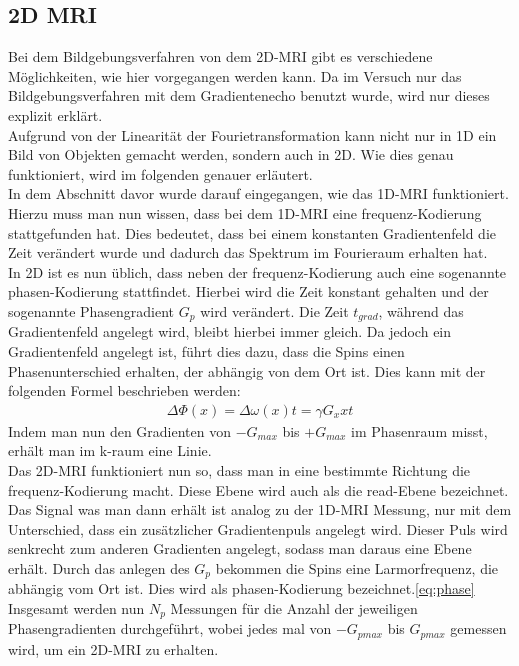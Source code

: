 \subsection{2D MRI}
Bei dem Bildgebungsverfahren von dem 2D-MRI gibt es verschiedene Möglichkeiten, wie hier vorgegangen werden kann. Da im Versuch nur das Bildgebungsverfahren mit dem Gradientenecho benutzt wurde, wird nur dieses explizit erklärt.\\
Aufgrund von der Linearität der Fourietransformation kann nicht nur in 1D ein Bild von Objekten gemacht werden, sondern auch in 2D. Wie dies genau funktioniert, wird im folgenden genauer erläutert.\\
In dem Abschnitt davor wurde darauf eingegangen, wie das 1D-MRI funktioniert. Hierzu muss man nun wissen, dass bei dem 1D-MRI eine frequenz-Kodierung stattgefunden hat. Dies bedeutet, dass bei einem konstanten Gradientenfeld die Zeit verändert wurde und dadurch das Spektrum im Fourieraum erhalten hat. \\
In 2D ist es nun üblich, dass neben der frequenz-Kodierung auch eine sogenannte phasen-Kodierung stattfindet. Hierbei wird die Zeit konstant gehalten und der sogenannte Phasengradient $G_p$ wird verändert. Die Zeit $t_{grad}$, während das Gradientenfeld angelegt wird, bleibt hierbei immer gleich. Da jedoch ein Gradientenfeld angelegt ist, führt dies dazu, dass die Spins einen Phasenunterschied erhalten, der abhängig von dem Ort ist. Dies kann mit der folgenden Formel beschrieben werden:
\begin{align}
    \Delta\Phi(x)= \Delta\omega(x)t=\gamma G_xxt
\end{align}\label{eq:phase}
Indem man nun den Gradienten von $-G_{max}$ bis $+G_{max}$ im Phasenraum misst, erhält man im k-raum eine Linie.\\
Das 2D-MRI funktioniert nun so, dass man in eine bestimmte Richtung die frequenz-Kodierung macht. Diese Ebene wird auch als die read-Ebene bezeichnet. Das Signal was man dann erhält ist analog zu der 1D-MRI Messung, nur mit dem Unterschied, dass ein zusätzlicher Gradientenpuls angelegt wird. Dieser Puls wird senkrecht zum anderen Gradienten angelegt, sodass man daraus eine Ebene erhält. Durch das anlegen des $G_p$ bekommen die Spins eine Larmorfrequenz, die abhängig vom Ort ist. Dies wird als phasen-Kodierung bezeichnet.\ref{eq:phase}
Insgesamt werden nun $N_p$ Messungen für die Anzahl der jeweiligen Phasengradienten durchgeführt, wobei jedes mal von $-G_{pmax}$ bis $G_{pmax}$ gemessen wird, um ein 2D-MRI zu erhalten.
